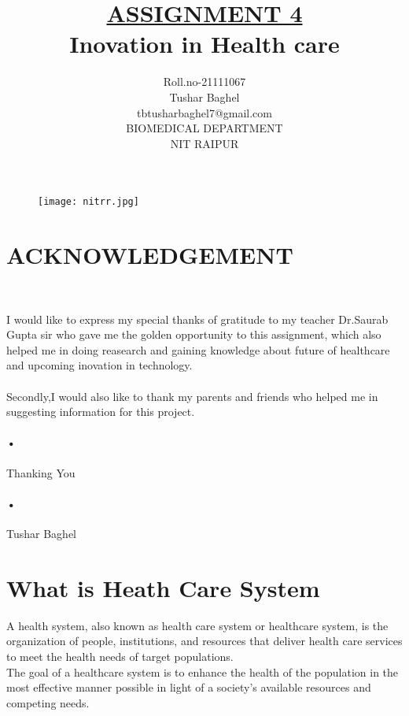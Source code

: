 \documentclass[12pt]{report}
\title{\underline{ASSIGNMENT 4} \\
Inovation in Health care  }
\author{Roll.no-21111067\\Tushar Baghel\\tbtusharbaghel7@gmail.com\\BIOMEDICAL DEPARTMENT\\NIT RAIPUR\\}
\begin{document}
\begin{figure}
\centering
\texttt{[image: nitrr.jpg]}
\end{figure}
\maketitle
\clearpage
\tableofcontents
\clearpage

\section{ACKNOWLEDGEMENT}\


I would like to express my special thanks of gratitude to my teacher Dr.Saurab Gupta sir who gave me the golden opportunity to this assignment, which also helped me in doing reasearch and gaining knowledge about future of healthcare and upcoming inovation in technology.\paragraph{}

Secondly,I would also like to thank my parents and friends who helped me in suggesting information for this project.\paragraph{•}


Thanking You\paragraph{•}

Tushar Baghel 

\clearpage


\section{What is Heath Care System}

A health system, also known as health care system or healthcare system, is the organization of people, institutions, and resources that deliver health care services to meet the health needs of target populations.\\
The goal of a healthcare system is to enhance the health of the population in the most effective manner possible in light of a society's available resources and competing needs.
\end{document}

